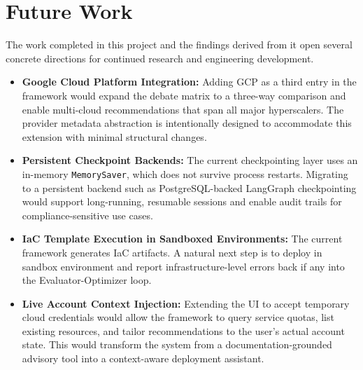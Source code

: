 \section{Future Work}
The work completed in this project and the findings derived from it open several concrete directions for continued research and engineering development.

\begin{itemize}
    \item \textbf{Google Cloud Platform Integration:} Adding GCP as a third entry in the framework would expand the debate matrix to a three-way comparison and enable multi-cloud recommendations that span all major hyperscalers. The provider metadata abstraction is intentionally designed to accommodate this extension with minimal structural changes.

    \item \textbf{Persistent Checkpoint Backends:} The current checkpointing layer uses an in-memory \texttt{MemorySaver}, which does not survive process restarts. Migrating to a persistent backend such as PostgreSQL-backed LangGraph checkpointing would support long-running, resumable sessions and enable audit trails for compliance-sensitive use cases.

    \item \textbf{IaC Template Execution in Sandboxed Environments:} The current framework generates IaC artifacts. A natural next step is to deploy in sandbox environment and report infrastructure-level errors back if any into the Evaluator-Optimizer loop.

    \item \textbf{Live Account Context Injection:} Extending the UI to accept temporary cloud credentials would allow the framework to query service quotas, list existing resources, and tailor recommendations to the user's actual account state. This would transform the system from a documentation-grounded advisory tool into a context-aware deployment assistant.
\end{itemize}